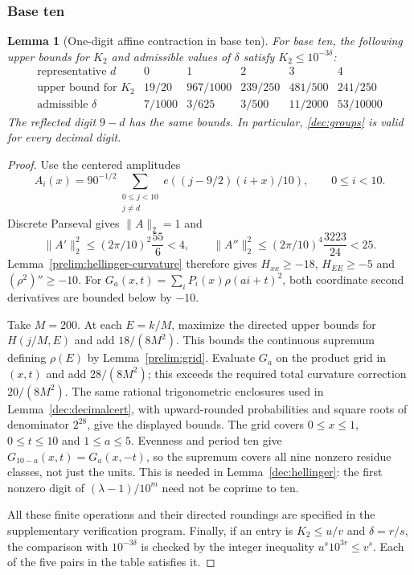 \documentclass[11pt,a4paper]{article}
\theoremstyle{paperplain}
\newtheorem{lemma}[theorem]{Lemma}
\numberwithin{equation}{section}
\begin{document}
\subsubsection{Base ten}

\begin{lemma}[One-digit affine contraction in base ten]
\label{dec:decimalhellinger}
For base ten, the following upper bounds for $K_2$ and admissible values
of $\delta$ satisfy $K_2\le10^{-3\delta}$:
\[
\begin{array}{c|ccccc}
 \text{representative }d&0&1&2&3&4\\ \hline
 \text{upper bound for }K_2&19/20&967/1000&239/250&481/500&241/250\\
 \text{admissible }\delta&7/1000&3/625&3/500&11/2000&53/10000
\end{array}
\]
The reflected digit $9-d$ has the same bounds. In particular,
\eqref{dec:groups} is valid for every decimal digit.
\end{lemma}
\begin{proof}
Use the centered amplitudes
\[
 A_i(x)=90^{-1/2}\sum_{\substack{0\le j<10\\j\ne d}}
             e((j-9/2)(i+x)/10),\qquad 0\le i<10.
\]
Discrete Parseval gives $\|A\|_2=1$ and
\[
 \|A'\|_2^2\le(2\pi/10)^2\frac{55}{6}<4,\qquad
 \|A''\|_2^2\le(2\pi/10)^4\frac{3223}{24}<25.
\]
Lemma~\ref{prelim:hellinger-curvature} therefore gives
$H_{xx}\ge-18$, $H_{EE}\ge-5$ and $(\rho^2)''\ge-10$.
For $G_a(x,t)=\sum_iP_i(x)\rho(ai+t)^2$, both coordinate second
derivatives are bounded below by $-10$.

Take $M=200$. At each $E=k/M$, maximize the directed upper bounds
for $H(j/M,E)$ and add $18/(8M^2)$. This bounds the continuous
supremum defining $\rho(E)$ by Lemma~\ref{prelim:grid}.
Evaluate $G_a$ on the product grid in $(x,t)$ and add $28/(8M^2)$;
this exceeds the required total curvature correction $20/(8M^2)$.
The same rational trigonometric enclosures used in
Lemma~\ref{dec:decimalcert}, with upward-rounded probabilities and
square roots of denominator $2^{28}$, give the displayed bounds.
The grid covers $0\le x\le1$, $0\le t\le10$ and $1\le a\le5$.
Evenness and period ten give $G_{10-a}(x,t)=G_a(x,-t)$, so the
supremum covers all nine nonzero residue classes, not just the units.
This is needed in Lemma~\ref{dec:hellinger}: the first nonzero digit
of $(\lambda-1)/10^m$ need not be coprime to ten.

All these finite operations and their directed roundings are specified
in the supplementary verification program.
Finally, if an entry is $K_2\le u/v$ and $\delta=r/s$, the comparison
with $10^{-3\delta}$ is checked by the integer inequality
$u^s10^{3r}\le v^s$. Each of the five pairs in the table satisfies it.
\end{proof}
\end{document}

